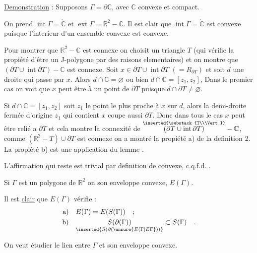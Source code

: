 \uline{Demonstration} : Supposons $\Gamma=\partial\mathbb{C}$, avec $\mathbb{C}$ convexe et compact.

On prend $\operatorname{int}\Gamma=\mathring{\mathbb{C}}$ et $\operatorname{ext}\Gamma=\mathbb{R}^{2}-\mathbb{C}$. Il est clair que $\operatorname{int}\Gamma=\mathring{\mathbb{C}}$ est convexe puisque l'interieur d'un ensemble convexe est convexe.

Pour montrer que $\mathbb{R}^{2}-\mathbb{C}$ est connexe on choisit un triangle $T$ (qui vérifie la propiété d'être un J-polygone par des raisons elementaires) et on montre que $(\partial T\cup\operatorname{int}\partial T)-\mathbb{C}$ est connexe. Soit $x\in\partial T\cup\operatorname{int}\partial T$  $(=R_{\partial T})$  et soit $d$ une droite qui passe par $x$. Alors $d\cap\mathbb{C}=\varnothing$ ou bien $d\cap\mathbb{C}=[z_1,z_2]$, Dans le premier cas on voit que $x$ peut être  à un point de $\partial T$ puisque $d\cap\partial T\ne\varnothing$.

Si $d\cap\mathbb{C}=[z_1,z_2]$ soit $z_1$ le point  le plus proche à $x$ sur $d$, alors la demi-droite fermée d'origine $z_1$ qui contient $x$ coupe aussi $\partial T$. Donc dans tous le cas $x$ peut être relié a $\partial T$ et cela montre la connexité de $\overset{\inserted{\substack{T\\\Vert}}}{(\partial T\cup\operatorname{int}\partial T)}-\mathbb{C}$, comme $(\mathbb{R}^{2}-T)\cup\partial T$ est connexe  on a montré la propiété a) de la definition 2. La propiété b) est une application  du lemme .

L'affirmation qui reste est trivial par definition de convexe,  c.q.f.d. .

Si $\Gamma$ est un polygone de $\mathbb{R}^{2}$ on  son enveloppe convexe, $E(\Gamma)$.

Il est \uline{clair} que $E(\Gamma)$ vérifie :
\[
\begin{aligned}
\text{a)}\quad & E(\Gamma)=E(S(\Gamma))\quad;\\
\text{b)}\quad & \underset{\inserted{S(\partial(\unsure{E(\Gamma|E\Gamma}))}}{S(\partial(\Gamma))}\subset S(\Gamma)\quad.
\end{aligned}
\]

On veut étudier le lien entre $\Gamma$ et son enveloppe convexe.
